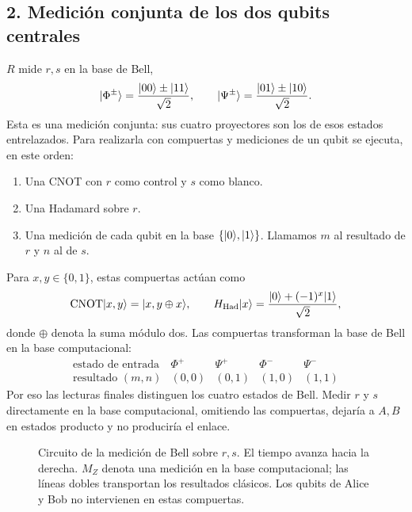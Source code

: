 \documentclass[letterpaper,12pt]{article}
\numberwithin{equation}{section}
\begin{document}
\subsection*{2. Medición conjunta de los dos qubits centrales}
$R$ mide $r,s$ en la base de Bell,
\begin{equation}
  {\vert \Phi^\pm \rangle}=\frac{{\vert 00 \rangle}\pm{\vert 11 \rangle}}{\sqrt2},
  \qquad
  {\vert \Psi^\pm \rangle}=\frac{{\vert 01 \rangle}\pm{\vert 10 \rangle}}{\sqrt2}.
\end{equation}
Esta es una medición conjunta: sus cuatro proyectores son los de esos
estados entrelazados. Para realizarla con compuertas y mediciones de un
qubit se ejecuta, en este orden:
\begin{enumerate}
  \item Una CNOT con $r$ como control y $s$ como blanco.
  \item Una Hadamard sobre $r$.
  \item Una medición de cada qubit en la base $\{{\vert 0 \rangle},{\vert 1 \rangle}\}$.
  Llamamos $m$ al resultado de $r$ y $n$ al de $s$.
\end{enumerate}
Para $x,y\in\{0,1\}$, estas compuertas actúan como
\[
  \mathrm{CNOT}{\vert x,y \rangle}={\vert x,y\oplus x \rangle},
  \qquad
  H_{\mathrm{Had}}{\vert x \rangle}=\frac{{\vert 0 \rangle}+(-1)^x{\vert 1 \rangle}}{\sqrt2},
\]
donde $\oplus$ denota la suma módulo dos.
Las compuertas transforman la base de Bell en la base computacional:
\[
  \begin{array}{c|cccc}
    \text{estado de entrada} & \Phi^+ & \Psi^+ & \Phi^- & \Psi^-\\ \hline
    \text{resultado }(m,n) & (0,0) & (0,1) & (1,0) & (1,1)
  \end{array}
\]
Por eso las lecturas finales distinguen los cuatro estados de Bell.
Medir $r$ y $s$ directamente en la base computacional, omitiendo las
compuertas, dejaría a $A,B$ en estados producto y no produciría el enlace.

\begin{figure}[H]
\centering
{}
\caption{Circuito de la medición de Bell sobre $r,s$. El tiempo avanza
hacia la derecha. $M_Z$ denota una medición en la base computacional;
las líneas dobles transportan los resultados clásicos. Los qubits de
Alice y Bob no intervienen en estas compuertas.}
\label{fig:medicion-bell}
\end{figure}
\end{document}
